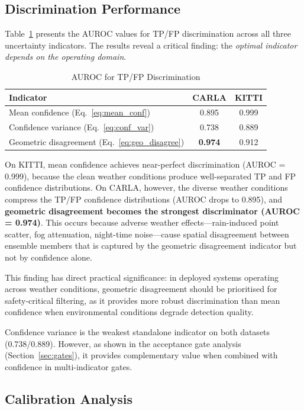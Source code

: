 \documentclass[conference]{IEEEtran}
\begin{document}
\subsection{Discrimination Performance}

Table~\ref{tab:auroc} presents the AUROC values for TP/FP discrimination across all three uncertainty indicators. The results reveal a critical finding: the \emph{optimal indicator depends on the operating domain}.

\begin{table}[t]
\caption{AUROC for TP/FP Discrimination}
\label{tab:auroc}
\centering
\begin{tabular}{lcc}
\toprule
\textbf{Indicator} & \textbf{CARLA} & \textbf{KITTI} \\
\midrule
Mean confidence (Eq.~\ref{eq:mean_conf}) & 0.895 & 0.999 \\
Confidence variance (Eq.~\ref{eq:conf_var}) & 0.738 & 0.889 \\
Geometric disagreement (Eq.~\ref{eq:geo_disagree}) & \textbf{0.974} & 0.912 \\
\bottomrule
\end{tabular}
\end{table}

On KITTI, mean confidence achieves near-perfect discrimination (AUROC = 0.999), because the clean weather conditions produce well-separated TP and FP confidence distributions. On CARLA, however, the diverse weather conditions compress the TP/FP confidence distributions (AUROC drops to 0.895), and \textbf{geometric disagreement becomes the strongest discriminator (AUROC = 0.974)}. This occurs because adverse weather effects---rain-induced point scatter, fog attenuation, night-time noise---cause spatial disagreement between ensemble members that is captured by the geometric disagreement indicator but not by confidence alone.

This finding has direct practical significance: in deployed systems operating across weather conditions, geometric disagreement should be prioritised for safety-critical filtering, as it provides more robust discrimination than mean confidence when environmental conditions degrade detection quality.

Confidence variance is the weakest standalone indicator on both datasets (0.738/0.889). However, as shown in the acceptance gate analysis (Section~\ref{sec:gates}), it provides complementary value when combined with confidence in multi-indicator gates.

\subsection{Calibration Analysis}
\end{document}
